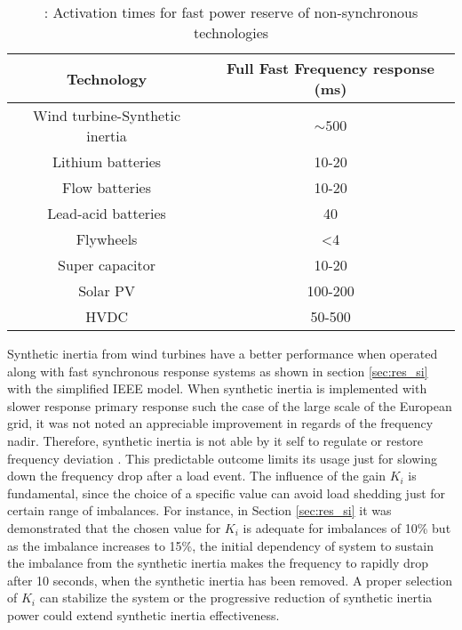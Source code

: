 \begin{table}[h]
	\caption{\label{tb:tech_times}: Activation times for fast power reserve of non-synchronous technologies \cite{miller2017technology}}
	\centering
	\begin{tabular}{cc}
		\toprule
		\textbf{Technology} 	& \textbf{ Full Fast Frequency response (ms)}\\
		\midrule
		
		Wind turbine-Synthetic inertia&	$ \sim500 $\\
		Lithium batteries&	10-20\\
		Flow batteries&	10-20\\
		Lead-acid batteries&	40\\
		Flywheels&	<4\\
		Super capacitor&	10-20\\
		Solar PV&	100-200\\
		HVDC&	50-500\\
		
		\bottomrule
	\end{tabular}
\end{table}

Synthetic inertia from wind turbines have a better performance when operated along with fast synchronous response systems as shown in section \ref{sec:res_si} with the simplified IEEE model. When synthetic inertia is implemented with slower response primary response such the case of the large scale of the European grid, it was not noted an appreciable improvement in regards of the frequency nadir. Therefore, synthetic inertia is not able by it self to regulate or restore frequency deviation \cite{Wu.2013}. This predictable outcome limits its usage just for slowing down the frequency drop after a load event.  The influence of the gain $ K_i $ is fundamental, since the choice of a specific value can avoid load shedding just for certain range of imbalances. For instance, in Section \ref{sec:res_si} it was demonstrated that the chosen value for $ K_i $ is adequate for imbalances of 10\% but as the imbalance increases to 15\%, the initial dependency of system to sustain the imbalance from the synthetic inertia makes the frequency to rapidly drop after 10 seconds, when the synthetic inertia has been removed. A proper selection of $ K_i $ can stabilize the system or the progressive reduction of synthetic inertia power could extend synthetic inertia effectiveness.\\


